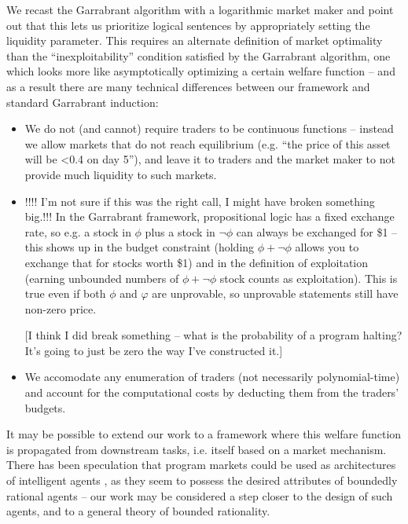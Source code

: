\documentclass{article}
\begin{document}

We recast the Garrabrant algorithm with a logarithmic market maker and point out that this lets us prioritize logical sentences by appropriately setting the liquidity parameter. This requires an alternate definition of market optimality than the ``inexploitability'' condition satisfied by the Garrabrant algorithm, one which looks more like asymptotically optimizing a certain welfare function -- and as a result there are many technical differences between our framework and standard Garrabrant induction:

\begin{itemize}
    \item We do not (and cannot) require traders to be continuous functions -- instead we allow markets that do not reach equilibrium (e.g. ``the price of this asset will be <0.4 on day 5''), and leave it to traders and the market maker to not provide much liquidity to such markets.
    \item !!!! I'm not sure if this was the right call, I might have broken something big.!!! In the Garrabrant framework, propositional logic has a fixed exchange rate, so e.g. a stock in $\phi$ plus a stock in $\lnot\phi$ can always be exchanged for \$1 -- this shows up in the budget constraint (holding $\phi+\lnot\phi$ allows you to exchange that for stocks worth \$1) and in the definition of exploitation (earning unbounded numbers of $\phi+\lnot\phi$ stock counts as exploitation). This is true even if both $\phi$ and $\varphi$ are unprovable, so unprovable statements still have non-zero price.
    
    [I think I did break something -- what is the probability of a program halting? It's going to just be zero the way I've constructed it.]
    \item We accomodate any enumeration of traders (not necessarily polynomial-time) and account for the computational costs by deducting them from the traders' budgets.
\end{itemize}

It may be possible to extend our work to a framework where this welfare function is propagated from downstream tasks, i.e. itself based on a market mechanism. There has been speculation that program markets could be used as architectures of intelligent agents \cite{oesterheld_futarchy_2017, branwen_evolution_2018}, as they seem to possess the desired attributes of boundedly rational agents \cite{oesterheld_theory_2021} -- our work may be considered a step closer to the design of such agents, and to a general theory of bounded rationality.
\end{document}
